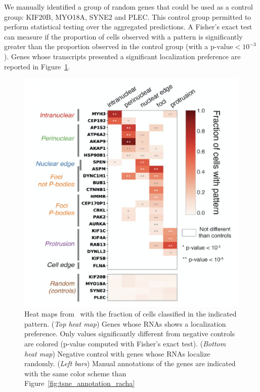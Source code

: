 We manually identified a group of random genes that could be used as a control group: KIF20B, MYO18A, SYNE2 and PLEC.
This control group permitted to perform statistical testing over the aggregated predictions.
A Fisher's exact test can measure if the proportion of cells observed with a pattern is significantly greater than the proportion observed in the control group (with a $\text{p-value} < 10^{-3}$).
Genes whose transcripts presented a significant localization preference are reported in Figure~\ref{fig:heatmap_racha}.

\begin{figure}[]
    \centering
    \includegraphics[width=\textwidth]{figures/chapter5/heatmap_racha_2}
    \caption[Heat maps with localization pattern classification results]{Heat maps from~\cite{CHOUAIB_2020} with the fraction of cells classified in the indicated pattern.
	(\textit{Top heat map}) Genes whose RNAs shows a localization preference.
	Only values significantly different from negative controls are colored (p-value computed with Fisher's exact test).
	(\textit{Bottom heat map}) Negative control with genes whose RNAs localize randomly.
	(\textit{Left bars}) Manual annotations of the genes are indicated with the same color scheme than Figure~\ref{fig:tsne_annotation_racha}}
    \label{fig:heatmap_racha}
\end{figure}

